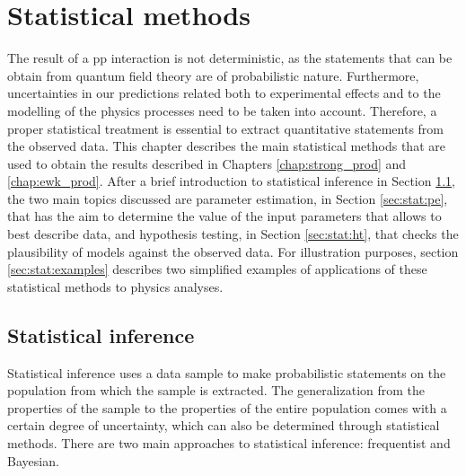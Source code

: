 \chapter{Statistical methods}
\label{chap:stat}

The result of a \gls{pp} interaction is not deterministic, as the statements that can be obtain from quantum field theory are of probabilistic nature. 
Furthermore, uncertainties in our predictions related both to experimental effects and to the modelling of the physics processes need to be taken into account. 
Therefore, a proper statistical treatment is essential to extract quantitative statements from the observed data. 
This chapter describes the main statistical methods that are used to obtain the results described in Chapters \ref{chap:strong_prod} and  \ref{chap:ewk_prod}. After a brief introduction to statistical inference in Section \ref{sec:stat:intro}, the two main topics discussed are parameter estimation, in Section \ref{sec:stat:pe}, that has the aim to determine the value of the input parameters that allows to best describe data, and hypothesis testing, in Section \ref{sec:stat:ht}, that checks the plausibility of models against the observed data. 
For illustration purposes, section \ref{sec:stat:examples} describes two simplified examples of applications of these statistical methods to physics analyses. 

\section{Statistical inference}
\label{sec:stat:intro}

Statistical inference uses a data sample to make probabilistic statements on the population from which the sample is extracted. The generalization from the properties of the sample to the properties of the entire population comes with a certain degree of uncertainty, which can also be determined  through statistical methods.
There are two main approaches to statistical inference: frequentist and Bayesian.

